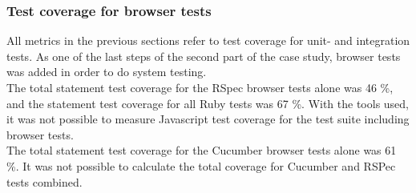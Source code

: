 \subsubsection{Test coverage for browser tests}

All metrics in the previous sections refer to test coverage for unit-
and integration tests. As one of the last steps of the second part of
the case study, browser tests was added in order to do system
testing.\\

The total statement test coverage for the RSpec browser tests alone was
46 \%, and the statement test coverage for all Ruby tests was 67 \%.
With the tools used, it was not possible to measure Javascript test
coverage for the test suite including browser tests.\\

The total statement test coverage for the Cucumber browser tests alone
was 61 \%. It was not possible to calculate the total coverage for
Cucumber and RSPec tests combined.\\
